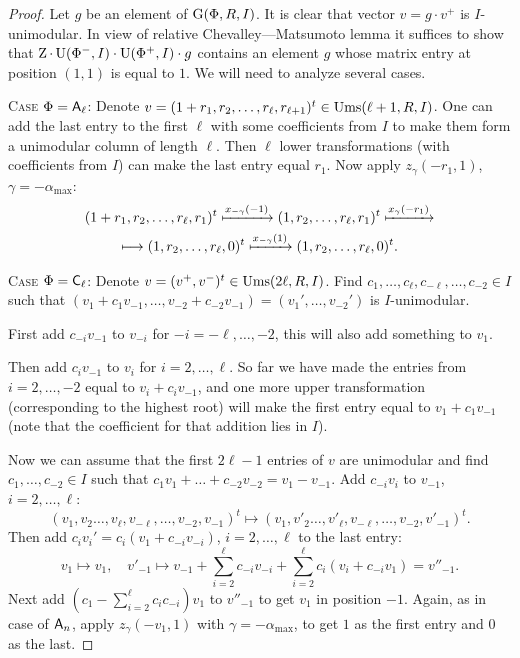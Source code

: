 \begin{proof}
Let $g$ be an element of $\operatorname{G}(\Phi, R, I)$. It is clear that vector $v=g\cdot v^+$ is $I$-unimodular.
In view of relative Chevalley---Matsumoto lemma it suffices to show that $\operatorname{Z} \cdot \operatorname{U}(\Phi^-, I) \cdot \operatorname{U}(\Phi^+, I) \cdot g$ contains an element $g$ whose matrix entry at position $(1,1)$ is equal to $1$.
We will need to analyze several cases.

\textsc{Case $\Phi=\mathsf{A}_\ell$:}
Denote $v=(1+r_1,r_2,\ldots,r_\ell,r_{\ell+1})^t\in\operatorname{Ums}(\ell+1,R,I)$.
One can add the last entry to the first $\ell$ with some coefficients from $I$ to make them form a unimodular column of length $\ell$.
Then $\ell$ lower transformations (with coefficients from $I$) can make the last entry equal $r_1$.
Now apply $z_\gamma(-r_1,1)$, $\gamma=-\alpha_{\max}$:
\begin{multline*}
(1+r_1,r_2,\ldots,r_\ell,r_1)^t\xmapsto{x_{-\gamma}(-1)}(1,r_2,\ldots,r_\ell,r_1)^t\xmapsto{x_\gamma(-r_1)}\\\longmapsto(1,r_2,\ldots,r_\ell,0)^t\xmapsto{x_{-\gamma}(1)}(1,r_2,\ldots,r_\ell,0)^t.
\end{multline*}

\textsc{Case $\Phi=\mathsf{C}_\ell$:}
Denote $v=(v^+,v^-)^t\in\operatorname{Ums}(2\ell,R,I)$. 
Find $c_1,\ldots, c_\ell, c_{-\ell},\ldots, c_{-2}\in I$ such that $(v_1+c_1v_{-1},\ldots,v_{-2}+c_{-2}v_{-1})=(v_1',\ldots,v_{-2}')$ is $I$-unimodular.

First add $c_{-i}v_{-1}$ to $v_{-i}$ for $-i=-\ell,\ldots,-2$, this will also add something to $v_1$.

Then add $c_iv_{-1}$ to $v_i$ for $i=2,\ldots,\ell$. So far we have made the entries from $i=2,\ldots,-2$ equal to $v_i+c_iv_{-1}$, and one more upper transformation (corresponding to the highest root) will make the first entry equal to $v_1+c_1v_{-1}$ (note that the coefficient for that addition lies in $I$).

Now we can assume that the first $2\ell-1$ entries of $v$ are unimodular and find $c_1,\ldots,c_{-2}\in I$ such that $c_1v_1+\ldots+c_{-2}v_{-2}=v_1-v_{-1}$. Add $c_{-i}v_i$ to $v_{-1}$, $i=2,\ldots,\ell$:
\[ (v_1,v_2\ldots,v_\ell,v_{-\ell},\ldots,v_{-2},v_{-1})^t\longmapsto (v_1,v'_2\ldots,v'_\ell,v_{-\ell},\ldots,v_{-2},v'_{-1})^t. \]
Then add $c_iv_i'=c_i(v_1+c_{-i}v_{-i})$, $i=2,\ldots,\ell$ to the last entry:
\[ v_1\longmapsto v_1,\quad v'_{-1}\longmapsto v_{-1}+\sum_{i=2}^\ell c_{-i}v_{-i}+\sum_{i=2}^\ell c_i(v_i+c_{-i}v_1)=v''_{-1}. \]
Next add $\left(c_1-\sum_{i=2}^\ell c_ic_{-i}\right)v_1$ to $v''_{-1}$ to get $v_1$ in position $-1$.
Again, as in case of $\mathsf{A}_n$, apply $z_\gamma(-v_1,1)$ with $\gamma=-\alpha_\mathrm{max}$, to get $1$ as the first entry and $0$ as the last.


\end{proof}
